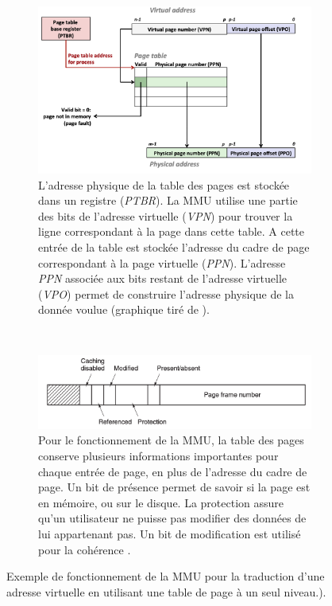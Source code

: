 \begin{figure}
    \centering
    \begin{subfigure}[b]{\linewidth}\centering
        \includegraphics[width=0.7\linewidth]{images/memory_page_table_nbits.png}
        \caption{L'adresse physique de la table des pages est stockée dans un registre (\textit{PTBR}). La MMU utilise une partie des bits de l'adresse virtuelle (\textit{VPN}) pour trouver la ligne correspondant à la page dans cette table. A cette entrée de la table est stockée l'adresse du cadre de page correspondant à la page virtuelle (\textit{PPN}). L'adresse \textit{PPN} associée aux bits restant de l'adresse virtuelle (\textit{VPO}) permet de construire l'adresse physique de la donnée voulue (graphique tiré de \cite{Mowry2012}).}
        \label{pic:memory_page_table_nbits}
    \end{subfigure}
    ~ %
    \begin{subfigure}[b]{\linewidth}\centering
        \includegraphics[width=0.7\linewidth]{images/memory_page_table_entry.png}
        \caption{Pour le fonctionnement de la MMU, la table des pages conserve plusieurs informations importantes pour chaque entrée de page, en plus de l'adresse du cadre de page. Un bit de présence permet de savoir si la page est en mémoire, ou sur le disque. La protection assure qu'un utilisateur ne puisse pas modifier des données de lui appartenant pas. Un bit de modification est utilisé pour la cohérence \cite{tanenbaum2008systemes}.}
        \label{pic:memory_page_table_entry}
    \end{subfigure}
    

    \caption{Exemple de fonctionnement de la MMU pour la traduction d'une adresse virtuelle en utilisant une table de page à un seul niveau.). }\label{fig:memory_page_table_un_niveau}
\end{figure}


